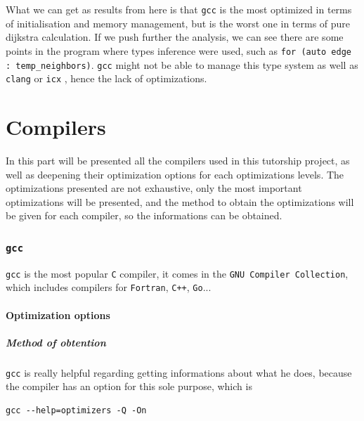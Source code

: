 \documentclass{rapport}
\newcommand{\gcc}{\texttt{gcc} }
\newcommand{\icx}{\texttt{icx} }
\newcommand{\clang}{\texttt{clang} }
\begin{document}
What we can get as results from here is that \gcc is the most optimized in terms of initialisation and memory management, but is the worst one in terms 
of pure dijkstra calculation. \newline
If we push further the analysis, we can see there are some points in the program where types inference were used, such as \texttt{for (auto edge : temp\_neighbors)}. 
\gcc might not be able to manage this type system as well as \clang or \icx, hence the lack of optimizations.

\clearpage
\part{Compilers}
In this part will be presented all the compilers used in this tutorship project, as well as deepening their optimization options for each optimizations levels.
\newline
The optimizations presented are not exhaustive, only the most important optimizations will be presented, and the method to obtain the optimizations will be given
for each compiler, so the informations can be obtained.
\section{\gcc}
\gcc is the most popular \texttt{C} compiler, it comes in the \texttt{GNU Compiler Collection}, which includes compilers for \texttt{Fortran}, \texttt{C++}, \texttt{Go}...
\subsection{Optimization options}
\subsubsection{Method of obtention}
\gcc is really helpful regarding getting informations about what he does, because the compiler has an option for this sole purpose, which is
\begin{verbatim}
gcc --help=optimizers -Q -On
\end{verbatim}
\end{document}
